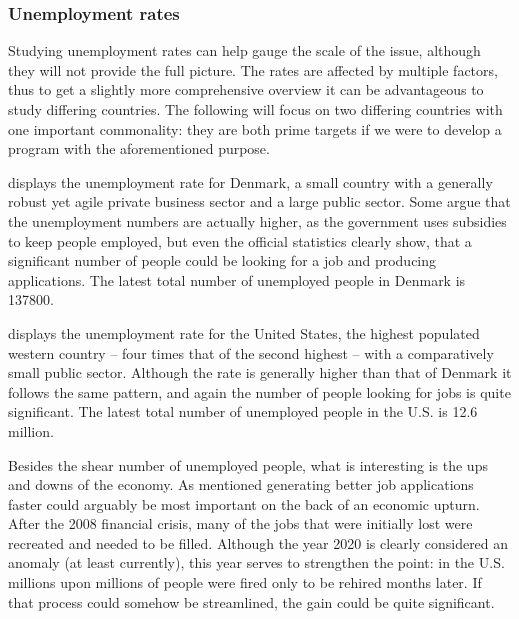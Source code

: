 \subsubsection{Unemployment rates}

Studying unemployment rates can help gauge the scale of the issue, although they
will not provide the full picture. The rates are affected by multiple factors,
thus to get a slightly more comprehensive overview it can be advantageous to
study differing countries. The following will focus on two differing countries
with one important commonality: they are both prime targets if we were to
develop a program with the aforementioned purpose.

 displays the unemployment rate for Denmark, a small country with a
generally robust yet agile private business sector and a large public sector.
Some argue that the unemployment numbers are actually higher, as the government
uses subsidies to keep people employed, but even the official statistics clearly
show, that a significant number of people could be looking for a job and
producing applications.\cite{cepos} The latest total number of unemployed people
in Denmark is 137800.\cite{Fultidledighed}


 displays the unemployment rate for the United States, the highest
populated western country -- four times that of the second highest -- with a
comparatively small public sector. Although the rate is generally higher than
that of Denmark it follows the same pattern, and again the number of people
looking for jobs is quite significant. The latest total number of unemployed
people in the U.S. is 12.6 million.\cite{Employment_summary}


Besides the shear number of unemployed people, what is interesting is the ups
and downs of the economy. As mentioned generating better job applications faster
could arguably be most important on the back of an economic upturn. After the
2008 financial crisis, many of the jobs that were initially lost were recreated
and needed to be filled. Although the year 2020 is clearly considered an anomaly
(at least currently), this year serves to strengthen the point: in the U.S.
millions upon millions of people were fired only to be rehired months later. If
that process could somehow be streamlined, the gain could be quite significant.

